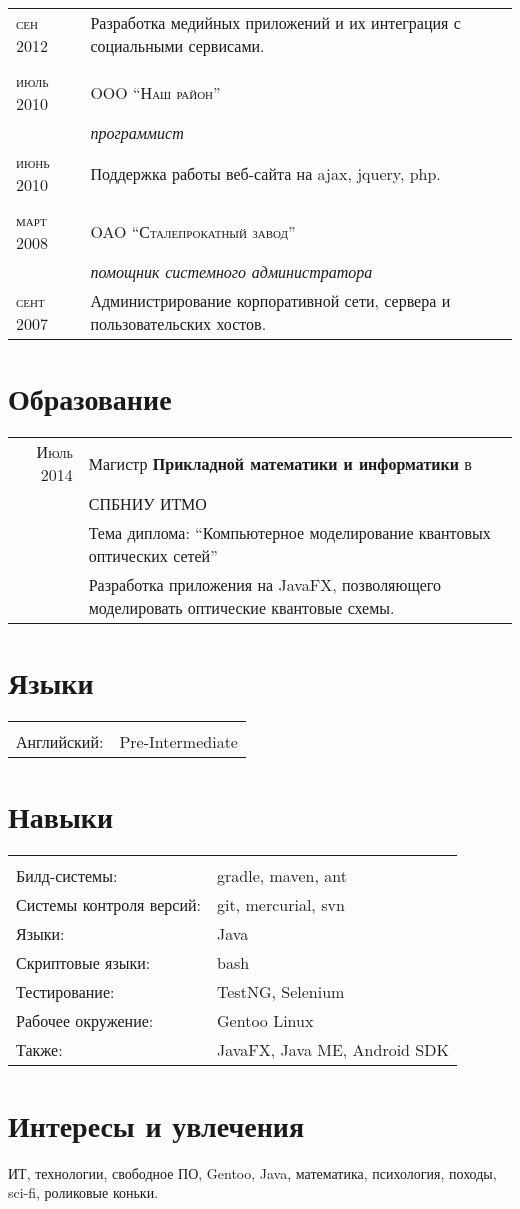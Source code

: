 \documentclass[a4paper,10pt]{article}
\begin{document}
\begin{tabular}{l|p{12cm}}
			\textsc{сен 2012}  & Разработка медийных приложений и их интеграция с социальными сервисами.\\
		\multicolumn{2}{c}{} \\
			\textsc{июль 2010} & 
				\textsc{OOO ``Наш район''}\\ & 	
				\emph{программист} \\
			\textsc{июнь 2010} & Поддержка работы веб-сайта на ajax, jquery, php.\\
		\multicolumn{2}{c}{} \\
			\textsc{март 2008} & 
				\textsc{OAO ``Сталепрокатный завод''}\\&
				\emph{помощник системного администратора}\\
			\textsc{сент 2007} & Администрирование корпоративной сети, сервера и пользовательских хостов.
	\end{tabular}
\newpage
\section{Образование}
	\begin{tabular}{rl}	
	  \textsc{Июль 2014} & Магистр \textbf{Прикладной математики и информатики} в \\& \textsc{СПБНИУ ИТМО}\\
			& Тема диплома: ``Компьютерное моделирование квантовых оптических сетей''\\&
			Разработка приложения на JavaFX, позволяющего моделировать оптические квантовые схемы.
	\end{tabular}
\newline
\section{Языки}
	\begin{tabular}{ll}
	\multicolumn{2}{c}{} \\
		Английский: & Pre-Intermediate 
	\end{tabular}
\newline
\section{Навыки}
	\begin{tabular}{ll}
	\multicolumn{2}{c}{} \\
		Билд-системы: & gradle, maven, ant \\
		Системы контроля версий: & git, mercurial, svn  \\
		Языки: & Java \\
		Скриптовые языки: & bash \\
		Тестирование: & TestNG, Selenium \\
		Рабочее окружение: & Gentoo Linux \\
		Также: & JavaFX, Java ME, Android SDK
	\end{tabular}
\newline
\section{Интересы и увлечения}
	ИТ, технологии, свободное ПО, Gentoo, Java, математика,
	психология, походы, sci-fi, роликовые коньки. 
\end{document}
